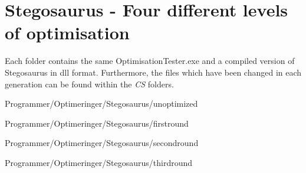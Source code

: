 \chapter{Stegosaurus - Four different levels of optimisation}
\label{app:E}
Each folder contains the same OptimisationTester.exe and a compiled version of Stegosaurus in dll format.
Furthermore, the files which have been changed in each generation can be found within the \textit{CS} folders.

Programmer/Optimeringer/Stegosaurus/unoptimized

Programmer/Optimeringer/Stegosaurus/first\textunderscore round

Programmer/Optimeringer/Stegosaurus/second\textunderscore round

Programmer/Optimeringer/Stegosaurus/third\textunderscore round


